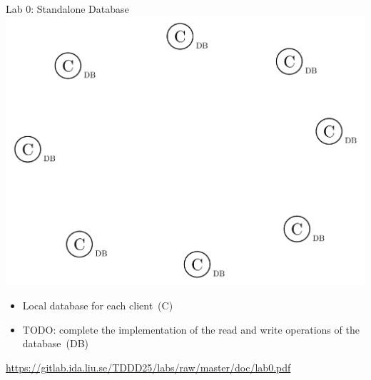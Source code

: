 \documentclass[compress,xcolor=table]{beamer}
\begin{document}
\begin{frame}{Lab 0: Standalone Database}
  \centering
  \includegraphics[scale=0.10,page=1]{include/assets/standalone-agents}
  \vspace{0.5em}
  \begin{itemize}
    \item Local database for each client~(C)
    \item \alert{TODO}: complete the implementation of the read and write
    operations of the database~(DB)
  \end{itemize}
  \begin{center}
    \scriptsize \url{https://gitlab.ida.liu.se/TDDD25/labs/raw/master/doc/lab0.pdf}
  \end{center}
\end{frame}
\end{document}
